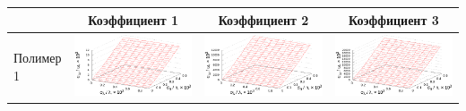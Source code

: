 \documentclass[12pt,a4paper]{article}
\begin{document}
\begin{table}[h]
  \centering
  \footnotesize
  \begin{tabular}{l | c c c}
	  & Коэффициент 1 & Коэффициент 2 & Коэффициент 3 \\ \hline
	\begin{rotate}{90}Полимер 1\end{rotate} &	\includegraphics[scale=0.4]{figs/all/p1.txt_coeff0.dat.eps} & \includegraphics[scale=0.4]{figs/all/p1.txt_coeff1.dat.eps} & \includegraphics[scale=0.4]{figs/all/p1.txt_coeff2.dat.eps} \\

\end{tabular}
\end{table}
\end{document}
